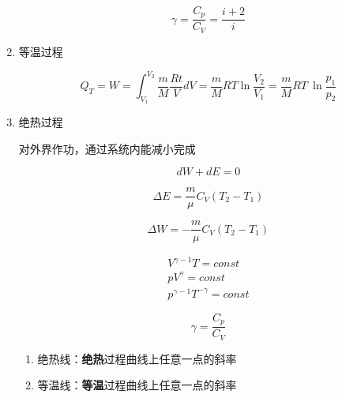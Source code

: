 \begin{enumerate}
          \begin{equation}
              \gamma{}=\frac{C_p}{C_V}=\frac{i+2}{i}
          \end{equation}

    \item 等温过程

          \begin{equation}
              Q_T=W=\int_{V_1}^{V_2}{\frac{m}{M}\frac{Rt}{V}dV}=\frac{m}{M}RT\ln\frac{V_2}{V_1}=\frac{m}{M}RT~\ln{\frac{p_1}{p_2}}
          \end{equation}

    \item 绝热过程

          对外界作功，通过系统内能减小完成

          \begin{equation}
              dW+dE=0
          \end{equation}

          \begin{equation}
              \Delta{E}=\frac{m}{\mu}C_V(T_2-T_1)
          \end{equation}

          \begin{equation}
              \Delta{W}=-\frac{m}{\mu}C_V(T_2-T_1)
          \end{equation}

          \begin{equation}
              \begin{aligned}
                  V^{\gamma{}-1}T=\mathit{const} \\
                  pV^{\gamma}=\mathit{const}     \\
                  p^{\gamma{}-1}T^{-\gamma}=\mathit{const}
              \end{aligned}
          \end{equation}

          \begin{equation}
              \gamma{}=\frac{C_p}{C_V}
          \end{equation}

          \begin{enumerate}
              \item 绝热线：\textbf{绝热}过程曲线上任意一点的斜率
              \item 等温线：\textbf{等温}过程曲线上任意一点的斜率
          \end{enumerate}

\end{enumerate}